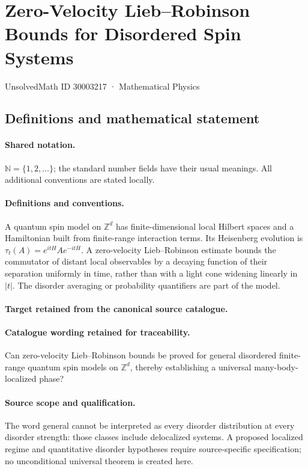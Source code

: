 \documentclass[11pt]{article}
\begin{document}
\setcounter{section}{30003216}
\section{Zero-Velocity Lieb–Robinson Bounds for Disordered Spin Systems}\label{30003217}
{\small UnsolvedMath ID 30003217 · Mathematical Physics}
\subsection{Definitions and mathematical statement}

\paragraph{Shared notation.}$\mathbb N=\{1,2,\ldots\}$; the standard number fields have their usual meanings. All additional conventions are stated locally.


\paragraph{Definitions and conventions.}
A quantum spin model on $\mathbb Z^d$ has finite-dimensional local Hilbert spaces and a Hamiltonian built from finite-range interaction terms. Its Heisenberg evolution is $\tau_t(A)=e^{itH}Ae^{-itH}$. A zero-velocity Lieb--Robinson estimate bounds the commutator of distant local observables by a decaying function of their separation uniformly in time, rather than with a light cone widening linearly in $|t|$. The disorder averaging or probability quantifiers are part of the model.

\paragraph{Target retained from the canonical source catalogue.}
\paragraph{Catalogue wording retained for traceability.}
Can zero-velocity Lieb–Robinson bounds be proved for general disordered finite-range quantum spin models on $\mathbb Z^d$, thereby establishing a universal many-body-localized phase?

\paragraph{Source scope and qualification.}
The word general cannot be interpreted as every disorder distribution at every disorder strength: those classes include delocalized systems. A proposed localized regime and quantitative disorder hypotheses require source-specific specification; no unconditional universal theorem is created here.
\end{document}
